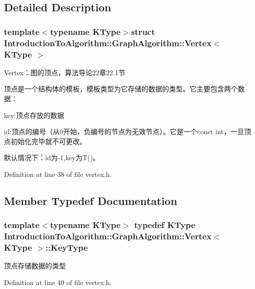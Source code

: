 \subsection{Detailed Description}
\subsubsection*{template$<$typename K\+Type$>$struct Introduction\+To\+Algorithm\+::\+Graph\+Algorithm\+::\+Vertex$<$ K\+Type $>$}

Vertex：图的顶点，算法导论22章22.1节 

顶点是一个结构体的模板，模板类型为它存储的数据的类型。它主要包含两个数据：


\begin{DoxyItemize}
\item {\ttfamily key}\+:顶点存放的数据
\item {\ttfamily id}\+:顶点的编号（从0开始，负编号的节点为无效节点）。它是一个{\ttfamily const int}，一旦顶点初始化完毕就不可更改。
\end{DoxyItemize}

默认情况下：{\ttfamily id}为-\/1,{\ttfamily key}为{\ttfamily T()}。 

Definition at line 38 of file vertex.\+h.



\subsection{Member Typedef Documentation}
\hypertarget{struct_introduction_to_algorithm_1_1_graph_algorithm_1_1_vertex_a14e958c58a404474853491eb811954cc}{}
\subsubsection[{Key\+Type}]{\setlength{\rightskip}{0pt plus 5cm}template$<$typename K\+Type$>$ typedef K\+Type {\bf Introduction\+To\+Algorithm\+::\+Graph\+Algorithm\+::\+Vertex}$<$ K\+Type $>$\+::{\bf Key\+Type}}\label{struct_introduction_to_algorithm_1_1_graph_algorithm_1_1_vertex_a14e958c58a404474853491eb811954cc}
顶点存储数据的类型 

Definition at line 40 of file vertex.\+h.

